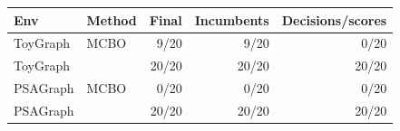 \begin{tabular}{llrrr}
\toprule
Env & Method & Final & Incumbents & Decisions/scores \\
\midrule
ToyGraph & MCBO & 9/20 & 9/20 & 0/20 \\
ToyGraph & \QMCBO{} & 20/20 & 20/20 & 20/20 \\
PSAGraph & MCBO & 0/20 & 0/20 & 0/20 \\
PSAGraph & \QMCBO{} & 20/20 & 20/20 & 20/20 \\
\bottomrule
\end{tabular}
